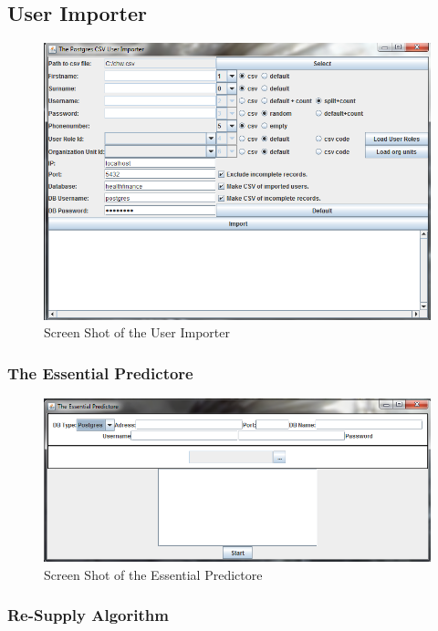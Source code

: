 \subsection{User Importer}

\begin{figure}
\centering
\includegraphics[width=\textwidth]{case/img/userImporterScreenShot}
\caption{Screen Shot of the User Importer}
\label{fig:screenUser}
\end{figure}
\subsubsection{The Essential Predictore}

\begin{figure}
\centering
\includegraphics[width=\textwidth]{case/img/essentialPredictoreScreenShot}
\caption{Screen Shot of the Essential Predictore}
\label{fig:essPred}
\end{figure}
\subsubsection{Re-Supply Algorithm}

